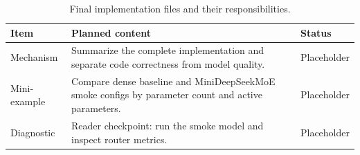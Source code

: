 \begin{table}[H]
\centering
\caption{Final implementation files and their responsibilities.}
\label{tab:ch10-chapter-summary-and-handoff}
\begin{tabularx}{\textwidth}{p{}X p{}}
\toprule
Item & Planned content & Status \\
\midrule
Mechanism & Summarize the complete implementation and separate code correctness from model quality. & Placeholder \\
Mini-example & Compare dense baseline and MiniDeepSeekMoE smoke configs by parameter count and active parameters. & Placeholder \\
Diagnostic & Reader checkpoint: run the smoke model and inspect router metrics. & Placeholder \\
\bottomrule
\end{tabularx}
\end{table}
